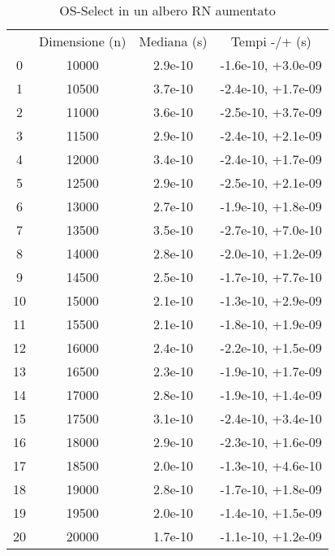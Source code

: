 \begin{table}
\centering
\caption{OS-Select in un albero RN aumentato}
\label{OS-Select in un albero RN aumentato}
\begin{adjustbox}{width=1\textwidth/2}
\begin{tabular}{|c|c|c|c|}
\hline
 & Dimensione (n) & Mediana (s) & Tempi -/+ (s) \\
0 & 10000 & 2.9e-10 & -1.6e-10, +3.0e-09 \\
\cline{1-4}
1 & 10500 & 3.7e-10 & -2.4e-10, +1.7e-09 \\
\cline{1-4}
2 & 11000 & 3.6e-10 & -2.5e-10, +3.7e-09 \\
\cline{1-4}
3 & 11500 & 2.9e-10 & -2.4e-10, +2.1e-09 \\
\cline{1-4}
4 & 12000 & 3.4e-10 & -2.4e-10, +1.7e-09 \\
\cline{1-4}
5 & 12500 & 2.9e-10 & -2.5e-10, +2.1e-09 \\
\cline{1-4}
6 & 13000 & 2.7e-10 & -1.9e-10, +1.8e-09 \\
\cline{1-4}
7 & 13500 & 3.5e-10 & -2.7e-10, +7.0e-10 \\
\cline{1-4}
8 & 14000 & 2.8e-10 & -2.0e-10, +1.2e-09 \\
\cline{1-4}
9 & 14500 & 2.5e-10 & -1.7e-10, +7.7e-10 \\
\cline{1-4}
10 & 15000 & 2.1e-10 & -1.3e-10, +2.9e-09 \\
\cline{1-4}
11 & 15500 & 2.1e-10 & -1.8e-10, +1.9e-09 \\
\cline{1-4}
12 & 16000 & 2.4e-10 & -2.2e-10, +1.5e-09 \\
\cline{1-4}
13 & 16500 & 2.3e-10 & -1.9e-10, +1.7e-09 \\
\cline{1-4}
14 & 17000 & 2.8e-10 & -1.9e-10, +1.4e-09 \\
\cline{1-4}
15 & 17500 & 3.1e-10 & -2.4e-10, +3.4e-10 \\
\cline{1-4}
16 & 18000 & 2.9e-10 & -2.3e-10, +1.6e-09 \\
\cline{1-4}
17 & 18500 & 2.0e-10 & -1.3e-10, +4.6e-10 \\
\cline{1-4}
18 & 19000 & 2.8e-10 & -1.7e-10, +1.8e-09 \\
\cline{1-4}
19 & 19500 & 2.0e-10 & -1.4e-10, +1.5e-09 \\
\cline{1-4}
20 & 20000 & 1.7e-10 & -1.1e-10, +1.2e-09 \\
\cline{1-4}
\end{tabular}
\end{adjustbox}
\end{table}

